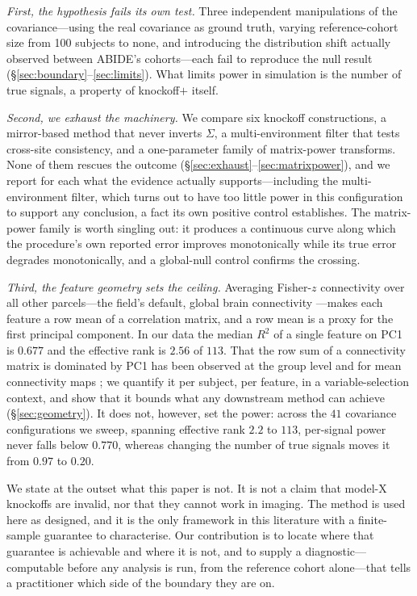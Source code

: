 \documentclass[11pt,a4paper]{article}
\begin{document}
\emph{First, the hypothesis fails its own test.} Three independent
manipulations of the covariance---using the real covariance as ground truth,
varying reference-cohort size from 100 subjects to none, and introducing the
distribution shift actually observed between ABIDE's cohorts---each fail to
reproduce the null result (\S\ref{sec:boundary}--\ref{sec:limits}). What
limits power in simulation is the number of true signals, a property of
knockoff$+$ itself.

\emph{Second, we exhaust the machinery.} We compare six knockoff
constructions, a mirror-based method that never inverts $\Sigma$, a
multi-environment filter that tests cross-site consistency, and a
one-parameter family of matrix-power transforms. None of them rescues the
outcome (\S\ref{sec:exhaust}--\ref{sec:matrixpower}), and we report for each
what the evidence actually supports---including the multi-environment filter,
which turns out to have too little power in this configuration to support any
conclusion, a fact its own positive control establishes. The matrix-power
family is worth singling out: it produces a continuous curve along which
the procedure's own reported error improves monotonically while its true
error degrades monotonically, and a global-null control confirms the
crossing.

\emph{Third, the feature geometry sets the ceiling.} Averaging
Fisher-$z$ connectivity over all other parcels---the field's default, global
brain connectivity \citep{cole2012global}---makes each feature a row mean of
a correlation matrix, and a row mean is a proxy for the first principal
component. In our data the median $R^2$ of a single feature on PC1 is
$0.677$ and the effective rank is $2.56$ of $113$. That the row sum of a
connectivity matrix is dominated by PC1 has been observed at the group level
\citep{vandenheuvel2025lnm} and for mean connectivity maps
\citep{moujaes2024ketamine}; we quantify it per subject, per feature, in a
variable-selection context, and show that it bounds what any downstream
method can achieve (\S\ref{sec:geometry}). It does not, however, set the
power: across the $41$ covariance configurations we sweep, spanning effective
rank $2.2$ to $113$, per-signal power never falls below $0.770$, whereas
changing the number of true signals moves it from $0.97$ to $0.20$.

We state at the outset what this paper is not. It is not a claim that
model-X knockoffs are invalid, nor that they cannot work in imaging. The
method is used here as designed, and it is the only framework in this
literature with a finite-sample guarantee to characterise. Our contribution
is to locate where that guarantee is achievable and where it is not, and to
supply a diagnostic---computable before any analysis is run, from the
reference cohort alone---that tells a practitioner which side of the
boundary they are on.
\end{document}
